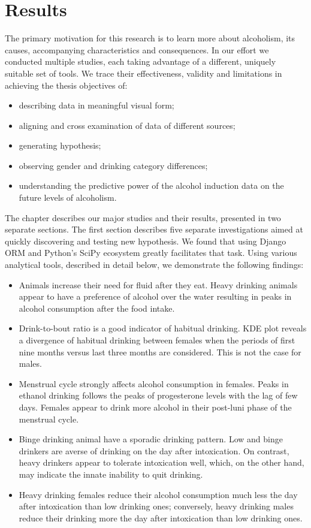 \chapter{Results}
The primary motivation for this research is to learn more about alcoholism, its causes, accompanying characteristics and consequences. In our effort we conducted multiple studies, each taking advantage of a different, uniquely suitable set of tools. We trace their effectiveness, validity and limitations in achieving the thesis objectives of:
\begin{itemize}
	\item describing data in meaningful visual form;
	\item aligning and cross examination of data of different sources;
	\item generating hypothesis;
	\item observing gender and drinking category differences;
	\item understanding the predictive power of the alcohol induction data on the future levels of alcoholism.
\end{itemize}

The chapter describes our major studies and their results, presented in two separate sections. The first section describes five separate investigations aimed at quickly discovering and testing new hypothesis. We found that using Django ORM and Python's SciPy ecosystem greatly facilitates that task. Using various analytical tools, described in detail below, we demonstrate the following findings: 
\begin{itemize}
	\item Animals increase their need for fluid after they eat. Heavy drinking animals appear to have a preference of alcohol over the water resulting in peaks in alcohol consumption after the food intake. 
	\item Drink-to-bout ratio is a good indicator of habitual drinking. KDE plot reveals a divergence of habitual drinking between females when the periods of first nine months versus last three months are considered. This is not the case for males.
	\item Menstrual cycle strongly affects alcohol consumption in females. Peaks in ethanol drinking follows the peaks of progesterone levels with the lag of few days. Females appear to drink more alcohol in their post-luni phase of the menstrual cycle.
	\item Binge drinking animal have a sporadic drinking pattern. Low and binge drinkers are averse of drinking on the day after intoxication. On contrast, heavy drinkers appear to tolerate intoxication well, which, on the other hand, may indicate the innate inability to quit drinking. 
	\item Heavy drinking females reduce their alcohol consumption much less the day
	after intoxication than low drinking ones; conversely, heavy drinking males reduce
	their drinking more the day after intoxication than low drinking ones.
\end{itemize}

